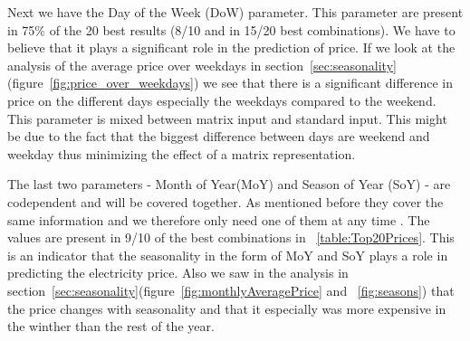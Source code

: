 Next we have the Day of the Week (DoW) parameter. This parameter are present in 75\% of the 20 best results (8/10 and in 15/20 best combinations). We have to believe that it plays a significant role in the prediction of price. If we look at the analysis of the average price over weekdays in section~\ref{sec:seasonality}(figure~\ref{fig:price_over_weekdays}) we see that there is a significant difference in price on the different days especially the weekdays compared to the weekend. This parameter is mixed between matrix input and standard input. This might be due to the fact that the biggest difference between days are weekend and weekday thus minimizing the effect of a matrix representation. 

The last two parameters - Month of Year(MoY) and Season of Year (SoY) - are codependent and will be covered together. As mentioned before they cover the same information and we therefore only need one of them at any time . The values are present in 9/10 of the best combinations in ~\ref{table:Top20Prices}. This is an indicator that the seasonality in the form of MoY and SoY plays a role in predicting the electricity price. Also we saw in the analysis in section~\ref{sec:seasonality}(figure~\ref{fig:monthlyAveragePrice} and ~\ref{fig:seasons}) that the price changes with seasonality and that it especially was more expensive in the winther than the rest of the year.



